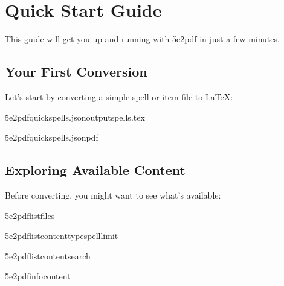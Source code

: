 \documentclass[letterpaper,10pt,english]{sphinxmanual}
\begin{document}
\section{Quick Start Guide}
\label{\detokenize{user-guide/quickstart:quick-start-guide}}\label{\detokenize{user-guide/quickstart::doc}}
\sphinxAtStartPar
This guide will get you up and running with 5e2pdf in just a few minutes.


\subsection{Your First Conversion}
\label{\detokenize{user-guide/quickstart:your-first-conversion}}
\sphinxAtStartPar
Let’s start by converting a simple spell or item file to LaTeX:

\begin{sphinxVerbatim}[commandchars=\\\{\}]
5e2pdfquickspells.json\PYGZhy{}\PYGZhy{}outputspells.tex

5e2pdfquickspells.json\PYGZhy{}\PYGZhy{}pdf
\end{sphinxVerbatim}


\subsection{Exploring Available Content}
\label{\detokenize{user-guide/quickstart:exploring-available-content}}
\sphinxAtStartPar
Before converting, you might want to see what’s available:

\begin{sphinxVerbatim}[commandchars=\\\{\}]
5e2pdflistfiles

5e2pdflistcontent\PYGZhy{}\PYGZhy{}typespell\PYGZhy{}\PYGZhy{}limit

5e2pdflistcontent\PYGZhy{}\PYGZhy{}search

5e2pdfinfocontent
\end{sphinxVerbatim}
\end{document}
